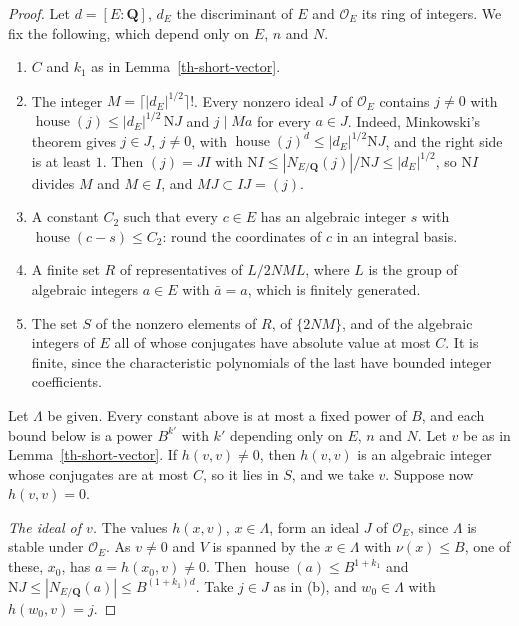 \begin{proof}
Let $d=[E:\mathbf Q]$, $d_E$ the discriminant of $E$ and $\mathcal O_E$ its ring of
integers. We fix the following, which depend only on $E$, $n$ and $N$.
\begin{enumerate}
\item[(a)] $C$ and $k_1$ as in Lemma~\ref{th-short-vector}.
\item[(b)] The integer $M=\lceil|d_E|^{1/2}\rceil!$. Every nonzero ideal $J$ of
  $\mathcal O_E$ contains $j\neq0$ with
  $\operatorname{house}(j)\leq|d_E|^{1/2}\,\mathrm NJ$ and $j\mid Ma$ for every
  $a\in J$. Indeed, Minkowski's theorem \cite[Chapter~I, \S6]{Neu99} gives $j\in J$,
  $j\neq0$, with $\operatorname{house}(j)^d\leq|d_E|^{1/2}\mathrm NJ$, and the
  right side is at least $1$. Then $(j)=JI$ with
  $\mathrm NI\leq|N_{E/\mathbf Q}(j)|/\mathrm NJ\leq|d_E|^{1/2}$, so $\mathrm NI$
  divides $M$ and $M\in I$, and $MJ\subset IJ=(j)$.
\item[(c)] A constant $C_2$ such that every $c\in E$ has an algebraic integer $s$
  with $\operatorname{house}(c-s)\leq C_2$: round the coordinates of $c$ in an
  integral basis.
\item[(d)] A finite set $R$ of representatives of $L/2NML$, where $L$ is the
  group of algebraic integers $a\in E$ with $\bar a=a$, which is finitely
  generated.
\item[(e)] The set $S$ of the nonzero elements of $R$, of $\{2NM\}$, and of the
  algebraic integers of $E$ all of whose conjugates have absolute value at most
  $C$. It is finite, since the characteristic polynomials of the last have
  bounded integer coefficients.
\end{enumerate}
Let $\Lambda$ be given. Every constant above is at most a fixed power of $B$, and
each bound below is a power $B^{k'}$ with $k'$ depending only on $E$, $n$ and
$N$. Let $v$ be as in Lemma~\ref{th-short-vector}. If $h(v,v)\neq0$, then
$h(v,v)$ is an algebraic integer whose conjugates are at most $C$, so it lies in
$S$, and we take $v$. Suppose now $h(v,v)=0$.

\emph{The ideal of $v$.} The values $h(x,v)$, $x\in\Lambda$, form an ideal $J$ of
$\mathcal O_E$, since $\Lambda$ is stable under $\mathcal O_E$. As $v\neq0$ and
$V$ is spanned by the $x\in\Lambda$ with $\nu(x)\leq B$, one of these, $x_0$, has
$a=h(x_0,v)\neq0$. Then $\operatorname{house}(a)\leq B^{1+k_1}$ and
$\mathrm NJ\leq|N_{E/\mathbf Q}(a)|\leq B^{(1+k_1)d}$. Take $j\in J$ as in (b),
and $w_0\in\Lambda$ with $h(w_0,v)=j$.


\end{proof}
